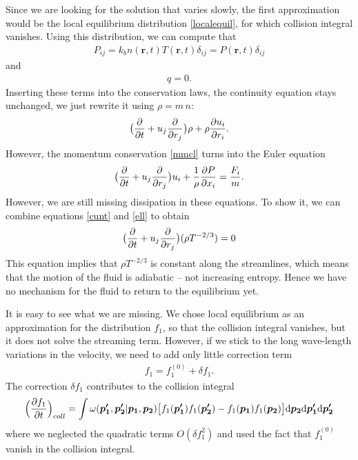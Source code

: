 Since we are looking for the solution that varies slowly, the first approximation would be the  local equilibrium distribution \ref{localequil}, for which collision integral vanishes.
%
Using this distribution, we can compute that
\begin{align*}
P_{ij} = k_b n(\bm{r},t) T(\bm{r},t) \delta_{ij} = P(\bm{r},t) \delta_{ij}
\end{align*} and
\begin{align*}
q = 0.
\end{align*}
Inserting these terms into the conservation laws, the continuity equation stays unchanged, we just rewrite it using $\rho = m\,n$:
\begin{align} \label{cunt}
\big(\frac{\partial}{\partial t} + u_j \frac{\partial}{\partial r_j} \big) \rho + \rho \frac{\partial u_i}{\partial r_i}.
\end{align}
However, the momentum conservation \ref{mmcl} turns into the Euler equation
\begin{align} \label{ell}
\big(\frac{\partial}{\partial t} + u_j \frac{\partial}{\partial r_j} \big) u_i  + \frac{1}{\rho}  \frac{\partial P}{\partial x_i} = \frac{F_i}{m}.
\end{align}
However, we are still missing dissipation in these equations. To show it, we can combine equations \ref{cunt} and \ref{ell} to obtain
\begin{align*}
\big( \frac{\partial}{\partial t} + u_j \frac{\partial}{\partial r_j} \big) (\rho T ^{-2/3}) = 0
\end{align*}
This equation implies that $\rho T^{-2/3}$ is constant along the streamlines, which means that the motion of the fluid is adiabatic -- not increasing entropy. Hence we have no mechanism for the fluid to return to the equilibrium yet.

It is easy to see what we are missing. We chose local equilibrium as an approximation for the distribution $f_1$, so that the collision integral vanishes, but it does not solve the streaming term. However, if we stick to the long wave-length variations in the velocity, we need to add only little correction term
\begin{align} \label{cord}
f_1 = f_1^{(0)} + \delta f_1.
\end{align}
The correction $\delta f_1$ contributes to the collision integral
\begin{align*}
\Big( \frac{\partial f_1}{\partial t} \Big)_{coll}= \int \omega(\bm{p'_1},\bm{p'_2} | \bm{p_1}, \bm{p_2}) \big[ f_1(\bm{p'_1})f_1(\bm{p'_2}) - f_1(\bm{p_1})f_1(\bm{p_2}) \big] \mathrm{d} \bm{p_2} \mathrm{d} \bm{p'_1} \mathrm{d} \bm{p'_2}
\end{align*}
where we neglected the quadratic terms $O(\delta f_1^2)$ and used the fact that $f_1^{(0)}$ vanish in the collision integral.

